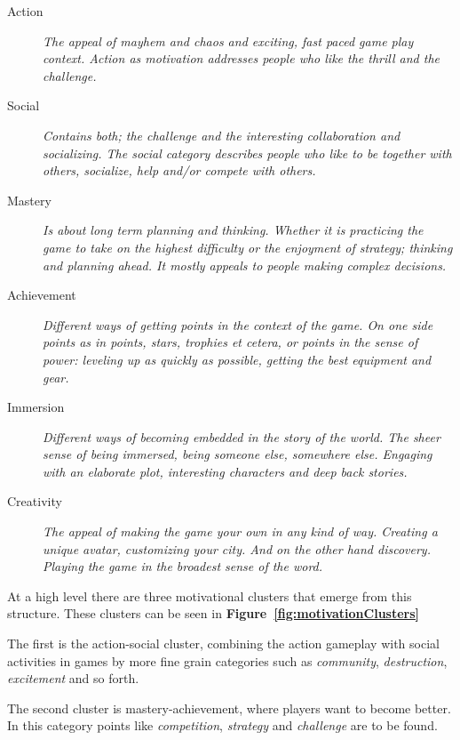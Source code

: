 \begin{description}%
	\item[Action] \textit{The appeal of mayhem and chaos and exciting, fast 
	paced game play context. Action as motivation addresses people who like the 
	thrill and the challenge.}
	\item[Social] \textit{Contains both; the challenge and the interesting 
	collaboration and socializing. The social category describes people who 
	like to be together with others, socialize, help and/or compete with 
	others.}
	\item[Mastery] \textit{Is about long term planning and thinking. Whether it 
	is practicing the game to take on the highest difficulty or the enjoyment 
	of strategy; thinking and planning ahead. It mostly appeals to people 
	making complex decisions.}
	\item[Achievement] \textit{Different ways of getting points in the context 
	of the game. On one side points as in points, stars, trophies et cetera, or 
	points in the sense of power: leveling up as quickly as possible, getting 
	the best equipment and gear.}
	\item[Immersion] \textit{Different ways of becoming embedded in the story 
	of the world. The sheer sense of being immersed, being someone else, 
	somewhere else. Engaging with an elaborate plot, interesting characters and 
	deep back stories.}
	\item[Creativity] \textit{The appeal of making the game your own in any 
	kind of way. Creating a unique avatar, customizing your city. And on the 
	other hand discovery. Playing the game in the broadest sense of the word.}
\end{description}

At a high level there are three motivational clusters that emerge from this 
structure. These clusters can be seen in 
\textbf{Figure~\ref{fig:motivationClusters}}

The first is the action-social cluster, combining the action gameplay with 
social activities in games by more fine grain categories such as 
\textit{community}, \textit{destruction}, \textit{excitement} and so forth. 

The second cluster is mastery-achievement, where players want to become better. 
In this category points like \textit{competition}, \textit{strategy} and 
\textit{challenge} are to be found. 

